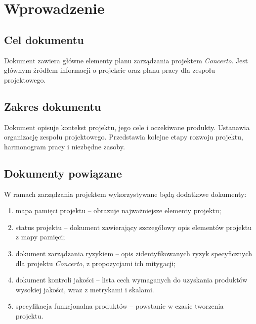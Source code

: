 \newpage
\section{Wprowadzenie}

\subsection{Cel dokumentu}
Dokument zawiera główne elementy planu zarządzania projektem \emph{Concerto}.
Jest głównym źródłem informacji o projekcie oraz planu pracy dla zespołu
projektowego.

\subsection{Zakres dokumentu}
Dokument opisuje kontekst projektu, jego cele i oczekiwane produkty. Ustanawia
organizację zespołu projektowego. Przedstawia kolejne etapy rozwoju projektu,
harmonogram pracy i niezbędne zasoby.

\subsection{Dokumenty powiązane}
W ramach zarządzania projektem wykorzystywane będą dodatkowe dokumenty:
\begin{enumerate}
    \item mapa pamięci projektu -- obrazuje najważniejsze elementy projektu;
    \item status projektu -- dokument zawierający szczegółowy opis elementów
        projektu z mapy pamięci;
    \item dokument zarządzania ryzykiem -- opis zidentyfikowanych ryzyk
        specyficznych dla projektu \emph{Concerto}, z propozycjami ich
        mitygacji;
    \item dokument kontroli jakości -- lista cech wymaganych do uzyskania
        produktów wysokiej jakości, wraz z metrykami i skalami.
    \item specyfikacja funkcjonalna produktów -- powstanie w czasie tworzenia
        projektu.
\end{enumerate}
